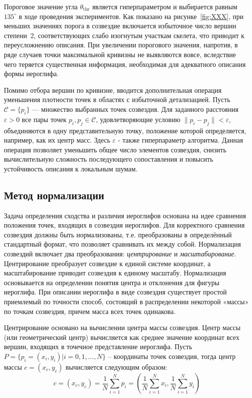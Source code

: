 Пороговое значение угла \(\theta_{\mathrm{thr}}\) является гиперпараметром и выбирается равным \(135^\circ\) в ходе проведения экспериментов. Как показано на рисунке~\cref{fig:XXX}, при меньших значениях порога в созвездие включается избыточное число вершин степени~2, соответствующих слабо изогнутым участкам скелета, что приводит к переусложнению описания. При увеличении порогового значения, напротив, в ряде случаев точки максимальной кривизны не выявляются вовсе, вследствие чего теряется существенная информация, необходимая для адекватного описания формы иероглифа.

Помимо отбора вершин по кривизне, вводится дополнительная операция уменьшения плотности точек в областях с избыточной детализацией. Пусть \(\mathcal{C} = \{p_i\}\) — множество выбранных точек созвездия. Для заданного расстояния \(\varepsilon > 0\) все пары точек \(p_i, p_j \in \mathcal{C}\), удовлетворяющие условию \(\|p_i - p_j\| < \varepsilon\), объединяются в одну представительную точку, положение которой определяется, например, как их центр масс. Здесь \(\varepsilon\) - также гиперпараметр алгоритма. Данная операция позволяет уменьшить общее число элементов созвездия, снизить вычислительную сложность последующего сопоставления и повысить устойчивость описания к локальным шумам.

\subsection{Метод нормализации}\label{sec:ch3/sec3/sub2}
Задача определения сходства и различия иероглифов основана на идее сравнения положения точек, входящих в созвездия иероглифов. Для корректного сравнения созвездия должны быть нормализованы, т.е. преобразованы в определённый стандартный формат, что позволяет сравнивать их между собой. Нормализация созвездий включает два преобразования: \textit{центрирование} и \textit{масштабирование}. Центрирование преобразует созвездие к единой системе координат, а масштабирование приводит созвездия к единому масштабу. Нормализация основывается на определении понятия центра и отклонения для фигуры иероглифа. При описании иероглифа в виде созвездия существует простой приемлемый по точности способ, состоящий в распределении некоторой «массы» по точкам созвездия, причем масса всех точек одинакова.

Центрирование основано на вычислении центра массы созвездия. Центр массы (или геометрический центр) вычисляется как среднее значение координат всех вершин, входящих в точечное представление иероглифа. Пусть $P=\{p_i=(x_i,y_i)|i=0,1,\ldots,N\}$ – координаты точек созвездия, тогда центр массы $c=(x_c, y_c)$ вычисляется следующим образом:
\[
    c=(x_c, y_c)=\frac{1}{N} \sum_{i=1}^{N}p_i = (\frac{1}{N}\sum_{i=1}^{N}x_i,\frac{1}{N}\sum_{i=1}^{N}y_i)\]


